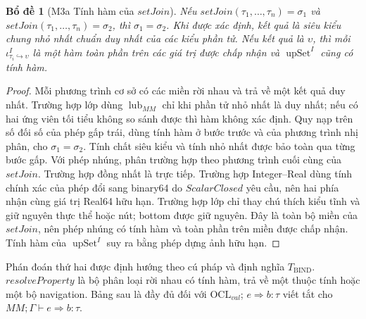 \documentclass[11pt,a4paper]{article}
\newtheorem{lemma}{Bổ đề}
\theoremstyle{definition}
\newcommand{\OCLval}{\mathrm{OCL}_{val}}
\begin{document}
\begin{lemma}[M3a Tính hàm của $setJoin$]
Nếu $setJoin(\tau_1,\ldots,\tau_n)=\sigma_1$ và
$setJoin(\tau_1,\ldots,\tau_n)=\sigma_2$, thì $\sigma_1=\sigma_2$.
Khi được xác định, kết quả là siêu kiểu chung nhỏ nhất chuẩn duy nhất của các
kiểu phần tử. Nếu kết quả là $\upsilon$, thì mỗi
$\iota^I_{\tau_i\hookrightarrow\upsilon}$ là một hàm toàn phần trên các giá
trị được chấp nhận và $\operatorname{upSet}^{I}$ cũng có tính hàm.
\end{lemma}
\begin{proof}
Mỗi phương trình cơ sở có các miền rời nhau và trả về một kết quả duy nhất.
Trường hợp lớp dùng $\operatorname{lub}_{MM}$ chỉ khi phần tử nhỏ nhất là duy
nhất; nếu có hai ứng viên tối tiểu không so sánh được thì hàm không xác định.
Quy nạp trên số đối số của phép gấp trái, dùng tính hàm ở bước trước và của
phương trình nhị phân, cho $\sigma_1=\sigma_2$. Tính chất siêu kiểu và tính nhỏ
nhất được bảo toàn qua từng bước gấp.
Với phép nhúng, phân trường hợp theo phương trình cuối cùng của $setJoin$.
Trường hợp đồng nhất
là trực tiếp. Trường hợp Integer--Real dùng tính chính xác của phép đổi sang
binary64 do $ScalarClosed$ yêu cầu, nên hai phía nhận cùng giá trị Real64 hữu
hạn. Trường hợp lớp chỉ thay chú thích kiểu tĩnh và giữ nguyên thực thể hoặc
nút; bottom được giữ nguyên. Đây là toàn bộ miền của $setJoin$, nên phép nhúng
có tính hàm và toàn phần trên miền được chấp nhận. Tính hàm của
$\operatorname{upSet}^{I}$ suy ra bằng phép dựng ảnh hữu hạn.
\end{proof}

Phán đoán thứ hai được định hướng theo cú pháp và định nghĩa
$T_{\mathrm{BIND}}$. $resolveProperty$ là bộ phân loại rời nhau có tính hàm,
trả về một thuộc tính hoặc một bộ navigation. Bảng sau là đầy đủ đối với
$\OCLval$; $e\Rightarrow b:\tau$ viết tắt cho
$MM;\Gamma\vdash e\Rightarrow b:\tau$.
\end{document}
